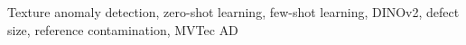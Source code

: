 \begin{abstract}
\end{abstract}

\begin{IEEEkeywords}
Texture anomaly detection, zero-shot learning, few-shot learning, DINOv2,
defect size, reference contamination, MVTec AD
\end{IEEEkeywords}
